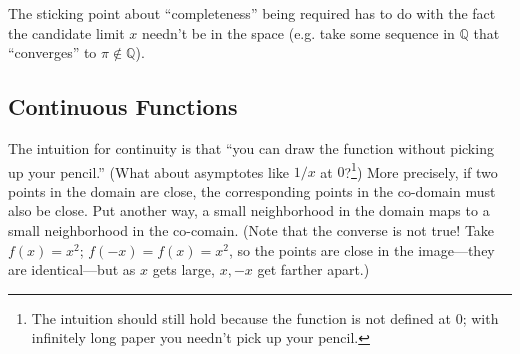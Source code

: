 \documentclass{article}
\begin{document}
\begin{remark}
  The sticking point about ``completeness'' being required has to do with the fact the candidate limit $x$ needn't be in the space (e.g. take some sequence in $\mathbb{Q}$ that ``converges'' to $\pi \notin \mathbb{Q}$).
\end{remark}

\subsection{Continuous Functions}
\label{sub:continuous_functions}

The intuition for continuity is that ``you can draw the function without picking up your pencil.'' (What about asymptotes like $1/x$ at $0$?\footnote{The intuition should still hold because the function is not defined at $0$; with infinitely long paper you needn't pick up your pencil.}) More precisely, if two points in the domain are close, the corresponding points in the co-domain must also be close. Put another way, a small neighborhood in the domain maps to a small neighborhood in the co-comain. (Note that the converse is not true! Take $f(x) = x^2$; $f(-x) = f(x) = x^2$, so the points are close in the image---they are identical---but as $x$ gets large, $x, -x$ get farther apart.)
\end{document}
